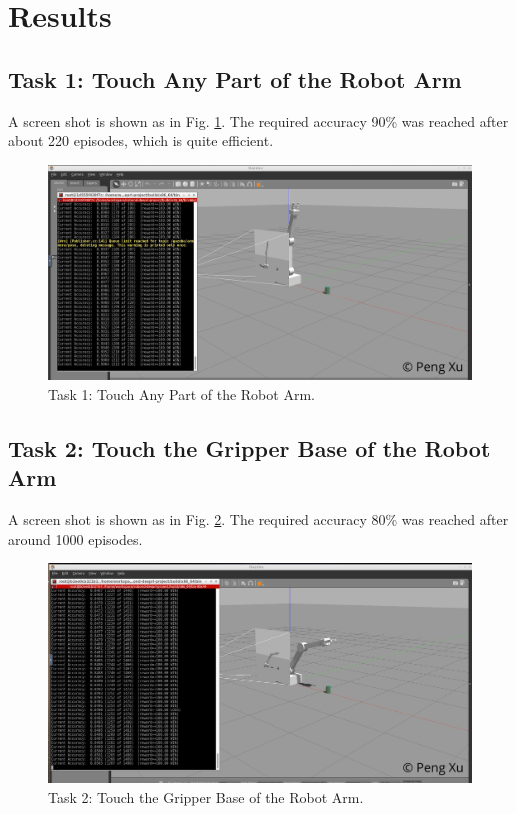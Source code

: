 \documentclass[10pt,journal,compsoc]{IEEEtran}
\begin{document}
\section{Results}

\subsection{Task 1: Touch Any Part of the Robot Arm}

A screen shot is shown as in Fig. \ref{fig:task1-sc}. The required accuracy 90\% was reached after about 220 episodes, which is quite efficient.

\begin{figure}[thpb]
      \centering
      \includegraphics[width=\linewidth]{figs/task1-sc.png}
      \caption{Task 1: Touch Any Part of the Robot Arm.}
      \label{fig:task1-sc}
\end{figure}

\subsection{Task 2: Touch the Gripper Base of the Robot Arm}

A screen shot is shown as in Fig. \ref{fig:task2-sc}. The required accuracy 80\% was reached after around 1000 episodes. 

\begin{figure}[thpb]
      \centering
      \includegraphics[width=\linewidth]{figs/task2-sc.png}
      \caption{Task 2: Touch the Gripper Base of the Robot Arm.}
      \label{fig:task2-sc}
\end{figure}
\end{document}
